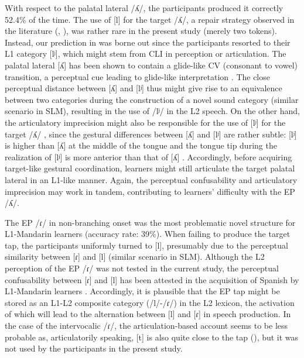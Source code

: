 \documentclass[output=paper]{../langscibook}
\begin{document}
With respect to the palatal lateral /ʎ/, the participants produced it correctly 52.4\% of the time. The use of [l] for the target /ʎ/, a repair strategy observed in the literature (\citealt{Batalha1995}, \citealt{Martins2008}), was rather rare in the present study (merely two tokens). Instead, our prediction in  was borne out since the participants resorted to their L1 category [lʲ], which might stem from CLI in perception or articulation. The palatal lateral [ʎ] has been shown to contain a glide-like CV (consonant to vowel) transition, a perceptual cue leading to glide-like interpretation \citep{Colantoni2004}. The close perceptual distance between [ʎ] and [lʲ] thus might give rise to an equivalence between two categories during the construction of a novel sound category (similar scenario in SLM), resulting in the use of /lʲ/ in the L2 speech. On the other hand, the articulatory imprecision might also be responsible for the use of [lʲ] for the target /ʎ/ \citep{Honikman1964}, since the gestural differences between [ʎ] and [lʲ] are rather subtle: [lʲ] is higher than [ʎ] at the middle of the tongue and the tongue tip during the realization of [lʲ] is more anterior than that of [ʎ] \citep{Wong2017}. Accordingly, before acquiring target-like gestural coordination, learners might still articulate the target palatal lateral in an L1-like manner. Again, the perceptual confusability and articulatory imprecision may work in tandem, contributing to learners’ difficulty with the EP /ʎ/.

The EP /ɾ/ in non-branching onset was the most problematic novel structure for L1-Mandarin learners (accuracy rate: 39\%). When failing to produce the target tap, the participants uniformly turned to [l], presumably due to the perceptual similarity between [ɾ] and [l] (similar scenario in SLM). Although the L2 perception of the EP /ɾ/ was not tested in the current study, the perceptual confusability between [ɾ] and [l] has been attested in the acquisition of Spanish by L1-Mandarin learners \citep{Chih2013}. Accordingly, it is plausible that the EP tap might be stored as an L1-L2 composite category (/l/-/ɾ/) in the L2 lexicon, the activation of which will lead to the alternation between [l] and [ɾ] in speech production. In the case of the intervocalic /ɾ/, the articulation-based account seems to be less probable as, articulatorily speaking, [t] is also quite close to the tap (\citealt{LadefogedJohnson2011}), but it was not used by the participants in the present study.
\end{document}
